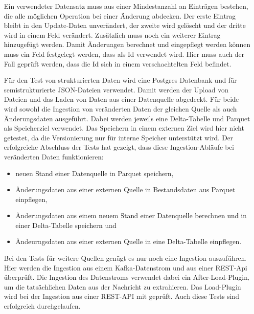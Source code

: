 Ein verwendeter Datensatz muss aus einer Mindestanzahl an Einträgen bestehen, die alle möglichen Operation bei einer Änderung abdecken.
Der erste Eintrag bleibt in den Update-Daten unverändert, der zweite wird gelöscht und der dritte wird in einem Feld verändert.
Zusätzlich muss noch ein weiterer Eintrag hinzugefügt werden.
Damit Änderungen berechnet und eingepflegt werden können muss ein Feld festgelegt werden, dass als Id verwendet wird.
Hier muss auch der Fall geprüft werden, dass die Id sich in einem verschachtelten Feld befindet.

Für den Test von strukturierten Daten wird eine Postgres Datenbank und für semistrukturierte JSON-Dateien verwendet.
Damit werden der Upload von Dateien und das Laden von Daten aus einer Datenquelle abgedeckt.
Für beide wird sowohl die Ingestion von veränderten Daten der gleichen Quelle als auch Änderungsdaten ausgeführt.
Dabei werden jeweils eine Delta-Tabelle und Parquet als Speicherziel verwendet.
Das Speichern in einem externen Ziel wird hier nicht getestet, da die Versionierung nur für interne Speicher unterstützt wird.
Der erfolgreiche Abschluss der Tests hat gezeigt, dass diese Ingestion-Abläufe bei veränderten Daten funktionieren: \begin{itemize}
    \item neuen Stand einer Datenquelle in Parquet speichern,
    \item Änderungsdaten aus einer externen Quelle in Bestandsdaten aus Parquet einpflegen,
    \item Änderungsdaten aus einem neuem Stand einer Datenquelle berechnen und in einer Delta-Tabelle speichern und
    \item Ändeurngsdaten aus einer externen Quelle in eine Delta-Tabelle einpflegen.
\end{itemize}

Bei den Tests für weitere Quellen genügt es nur noch eine Ingestion auszuführen.
Hier werden die Ingestion aus einem Kafka-Datenstrom und aus einer REST-Api überprüft.
Die Ingestion des Datenstroms verwendet dabei ein After-Load-Plugin, um die tatsächlichen Daten aus der Nachricht zu extrahieren.
Das Load-Plugin wird bei der Ingestion aus einer REST-API mit geprüft.
Auch diese Tests sind erfolgreich durchgelaufen.